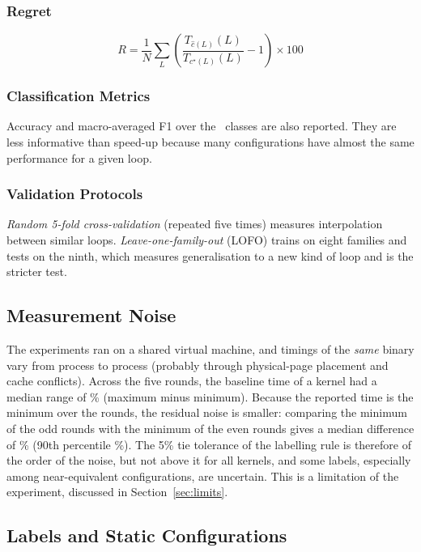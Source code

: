 \documentclass[12pt,a4paper]{article}
\begin{document}
\subsubsection{Regret}

\[
R=\frac{1}{N}\sum_L\left(\frac{T_{\hat c(L)}(L)}{T_{c^{\star}(L)}(L)}-1\right)\times100
\]

\subsubsection{Classification Metrics}

Accuracy and macro-averaged F1 over the \numConfigs\ classes are also reported.
They are less informative than speed-up because many configurations have almost the
same performance for a given loop.

\subsubsection{Validation Protocols}

\emph{Random 5-fold cross-validation} (repeated five times) measures interpolation
between similar loops. \emph{Leave-one-family-out} (LOFO) trains on eight families
and tests on the ninth, which measures generalisation to a new kind of loop and is
the stricter test.

\subsection{Measurement Noise}

The experiments ran on a shared virtual machine, and timings of the \emph{same} binary
vary from process to process (probably through physical-page placement and
cache conflicts). Across the five rounds, the baseline time of a kernel had a median
range of \noiseSpreadMedian\% (maximum minus minimum). Because the reported time is the
minimum over the rounds, the residual noise is smaller: comparing the minimum of the
odd rounds with the minimum of the even rounds gives a median difference of
\noiseSplitMedian\% (90th percentile \noiseSplitNinety\%). The 5\% tie tolerance of the
labelling rule is therefore of the order of the noise, but not above it for all kernels,
and some labels, especially among near-equivalent configurations, are uncertain.
This is a limitation of the experiment, discussed in Section~\ref{sec:limits}.

\subsection{Labels and Static Configurations}
\end{document}
